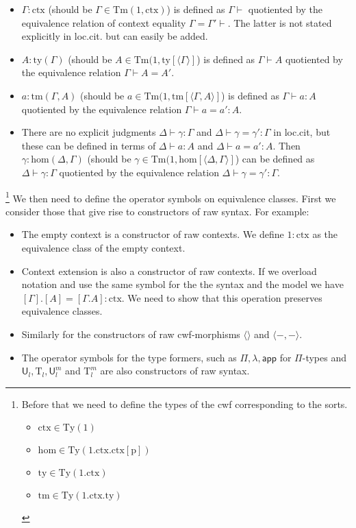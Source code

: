 \documentclass[11pt,a4paper]{article}
\theoremstyle{plain}
\theoremstyle{definition}
\newcommand{\app}[2]{{#1\,#2}} %
\newcommand{\Ty}{\mathrm{Ty}}
\newcommand{\Tm}{\mathrm{Tm}}
\def\sub{\mathrm{hom}}
\newcommand{\ctx}{\mathrm{ctx}}
\newcommand{\ty}{\mathrm{ty}}
\newcommand{\tm}{\mathrm{tm}}
\newcommand{\tuple}[1]{\langle #1 \rangle}
\def\p{\mathrm{p}}
\def\app{\mathsf{app}}
\def\U{\mathsf{U}}
\newcommand{\Ta}{\mathrm{T}}
\begin{document}
\begin{itemize}
\item $\Gamma : \ctx$ (should be $\Gamma \in \Tm(1,\ctx)$) is defined as $\Gamma \vdash$ quotiented by the equivalence relation of context equality $\Gamma = \Gamma' \vdash$. The latter is not stated explicitly in loc.cit. but can easily be added.
\item $A :\ty(\Gamma)$ (should be $A \in \Tm(1,\ty[\tuple{\Gamma}]$) is defined as $\Gamma \vdash A$ quotiented by the equivalence relation $\Gamma \vdash A = A'$.
\item $a : \tm(\Gamma,A)$ (should be $a \in \Tm(1,\tm[\tuple{\Gamma,A}]$) is defined as $\Gamma \vdash a : A$ quotiented by the equivalence relation $\Gamma \vdash a = a' : A$.
\item There are no explicit judgments $\Delta \vdash \gamma : \Gamma$ and $\Delta \vdash \gamma = \gamma' : \Gamma$  in loc.cit, but these can be defined in terms of $\Delta \vdash a : A$ and $\Delta \vdash a = a' : A$. Then $\gamma : \sub(\Delta,\Gamma)$ (should be
$\gamma \in \Tm(1,\sub[\tuple{\Delta,\Gamma}]$) can be defined as $\Delta \vdash \gamma : \Gamma$ quotiented by the equivalence relation $\Delta \vdash  \gamma = \gamma' : \Gamma$.
\end{itemize}
\footnote{Before that we need to define the types of the cwf corresponding to the sorts.
\begin{itemize}
\item $\ctx \in \Ty(1)$
\item $\sub \in \Ty(1.\ctx.\ctx[\p])$
\item $\ty \in \Ty(1.\ctx)$
\item $\tm \in \Ty(1.\ctx.\ty)$
\end{itemize}

}
We then need to define the operator symbols on equivalence classes. First we consider those that give rise to constructors of raw syntax. For example:
\begin{itemize}
\item The empty context is a constructor of raw contexts. We define $1 : \ctx$ as the equivalence class of the empty context.
\item Context extension is also a constructor of raw contexts. If we overload notation and use the same symbol for the the syntax and the model we have $[\Gamma].[A] = [\Gamma.A]: \ctx$. We need to show that this operation preserves equivalence classes.
\item Similarly for the constructors of raw cwf-morphisms $\tuple{}$ and $\tuple{-,-}$.
\item The operator symbols for the type formers, such as $\Pi, \lambda, \app$ for $\Pi$-types and $\U_l, \Ta_l, \U^m_l$ and $\Ta^m_l$ are also constructors of raw syntax.
\end{itemize}
\end{document}

